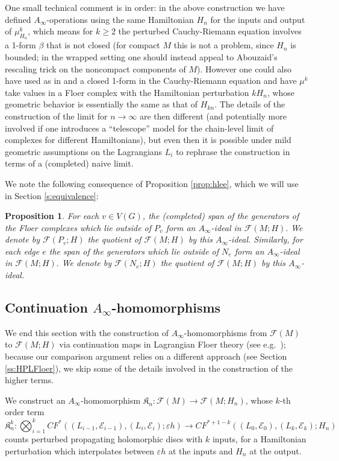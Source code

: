 \documentclass[11pt,leqno]{amsart}
\newtheorem{prop}[theo]{Proposition}
\numberwithin{equation}{section}
\newcommand{\cF}{{\mathcal F}}
\newcommand{\cE}{{\mathcal E}}
\begin{document}
One small technical comment is in order: in the above construction we have
defined $A_\infty$-operations using the same Hamiltonian $H_n$ for the inputs and output 
of $\mu^k_{H_n}$, which means for $k\geq 2$ the perturbed Cauchy-Riemann equation involves
a 1-form $\beta$ that is not closed (for compact $M$ this is not a problem, since $H_n$ is
bounded; in the wrapped setting one should instead appeal to Abouzaid's rescaling trick on the noncompact components of $M$).
However one could also have used as in \cite{Lee} and \cite{AuSm} a closed 1-form in the Cauchy-Riemann equation and have
$\mu^k$ take values in a Floer complex with the Hamiltonian perturbation $kH_n$,
whose geometric behavior is essentially the same as that of $H_{kn}$.  The
details of the construction of the limit for $n\to \infty$ are then
different (and potentially more involved if one introduces a ``telescope'' model
for the chain-level limit of complexes for different Hamiltonians), but even
then it is possible under mild geometric assumptions on the Lagrangians
$L_i$ to rephrase the construction in terms of a (completed) naive limit.

We note the following consequence of Proposition
\ref{prop:hlee}, which we will use in Section \ref{s:equivalence}:

\begin{prop}\label{prop:ainfty_ideal}
For each $v\in V(G)$, the (completed) span of the generators of the Floer complexes
which lie outside of $P_v$ form an $A_{\infty}\!$-ideal in $\cF(M;H).$ 
We denote by $\cF(P_v;H)$ the quotient of $\cF(M;H)$ by this $A_{\infty}\!$-ideal.
Similarly, for each edge $e$ the span of the generators which lie outside of $N_e$ 
form an $A_{\infty}\!$-ideal in $\cF(M;H).$ We denote by $\cF(N_e;H)$ the quotient 
of $\cF(M;H)$ by this $A_{\infty}\!$-ideal. 
\end{prop}

\subsection{Continuation $A_\infty$-homomorphisms}\label{ss:continuation}
We end this section with the construction of $A_\infty$-homomorphisms from $\cF(M)$ to $\cF(M;H)$
via continuation maps in Lagrangian Floer theory (see e.g.\ \cite{SeBook});
because our comparison argument relies on a different approach (see Section \ref{ss:HPLFloer}), 
we skip some of the details involved in the construction of the higher terms. 

We construct an $A_\infty$-homomorphism $\mathfrak{K}_n:\cF(M)\to \cF(M;H_n)$, whose $k$-th order
term
$$\mathfrak{K}_n^k:\bigotimes_{i=1}^k CF^*((L_{i-1},\cE_{i-1}),(L_i,\cE_i);\varepsilon h)\to 
CF^{*+1-k}((L_0,\cE_0),(L_k,\cE_k);H_n)$$
counts perturbed propagating holomorphic discs with $k$ inputs,
for a Hamiltonian perturbation which interpolates between
$\varepsilon h$ at the inputs and $H_n$ at the output. 
\end{document}
